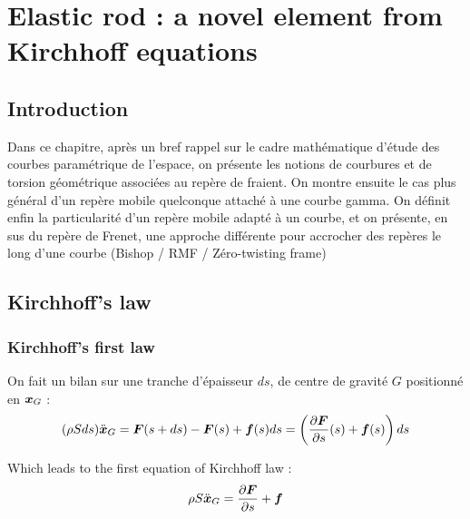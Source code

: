 \chapter{Elastic rod : a novel element from Kirchhoff equations}
\lipsum[1]

\section{Introduction}
Dans ce chapitre, après un bref rappel sur le cadre mathématique d'étude des courbes paramétrique de l'espace, on présente les notions de courbures et de torsion géométrique associées au repère de fraient. On montre ensuite le cas plus général d'un repère mobile quelconque attaché à une courbe gamma. On définit enfin la particularité d'un repère mobile adapté à un courbe, et on présente, en sus du repère de Frenet, une approche différente pour accrocher des repères le long d'une courbe (Bishop / RMF / Zéro-twisting frame)

\section{Kirchhoff's law}

\subsection{Kirchhoff's first law}
On fait un bilan sur une tranche d'épaisseur $ds$, de centre de gravité $G$ positionné en $\boldsymbol{x}_G$ :
\begin{equation}
	(\rho Sds)\ddot{\boldsymbol{x}}_G = \boldsymbol{F}(s+ds)-\boldsymbol{F}(s) + \boldsymbol{f}(s)ds = \left(\frac{\partial \boldsymbol{F}}{\partial s}(s)+\boldsymbol{f}(s)\right)ds
\end{equation}

Which leads to the first equation of Kirchhoff law :
\begin{equation}
	\rho S \ddot{\boldsymbol{x}}_G = \frac{\partial \boldsymbol{F}}{\partial s}+\boldsymbol{f}
\end{equation}

